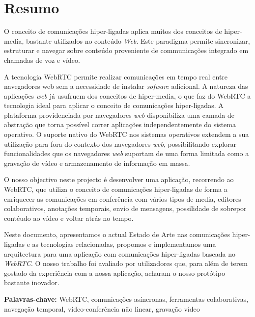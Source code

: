 \chapter*{Resumo}


O conceito de comunicações hiper-ligadas aplica muitos dos conceitos de hiper-media, bastante utilizados no conteúdo \emph{Web}. Este paradigma permite sincronizar, estruturar e navegar sobre conteúdo proveniente de communicações integrado em chamadas de voz e vídeo.



A tecnologia \ac{WebRTC} permite realizar comunicações em tempo real entre navegadores web sem a necessidade de instalar \emph{sofware} adicional. A natureza das aplicações \emph{web} já usufruem dos conceitos de hiper-media, o que faz do \ac{WebRTC} a tecnologia ideal para aplicar o conceito de comunicações hiper-ligadas.
A plataforma providenciada por navegadores \emph{web} disponibiliza uma camada de abstração que torna possível correr aplicações independentemente do sistema operativo.
O suporte nativo do \ac{WebRTC} nos sistemas operativos extendem a sua utilização para fora do contexto dos navegadores \emph{web}, possibilitando explorar funcionalidades que os navegadores \emph{web} suportam de uma forma limitada como a gravação de vídeo e armazenamento de informação em massa.

O nosso objectivo neste projecto é desenvolver uma aplicação, recorrendo ao \ac{WebRTC}, que utiliza o conceito de comunicações hiper-ligadas de forma a enriquecer as comunicações em conferência com vários tipos de media, editores colaborativos, anotações temporais, envio de mensagens, possilidade de sobrepor contéudo ao vídeo e voltar atrás no tempo.


Neste documento, apresentamos o actual Estado de Arte nas comunicações hiper-ligadas e as tecnologias relacionadas, propomos e implementamos uma arquitectura para uma aplicação com comunicações hiper-ligadas baseada no \emph{WebRTC}. O nosso trabalho foi avaliado por utilizadores que, para além de terem gostado da experiência com a nossa aplicação, acharam o nosso protótipo bastante inovador.

\vspace{1cm}

\textbf{\Large Palavras-chave:} WebRTC, comunicações asíncronas, ferramentas colaborativas, navegação temporal, vídeo-conferência não linear, gravação vídeo


\cleardoublepage
